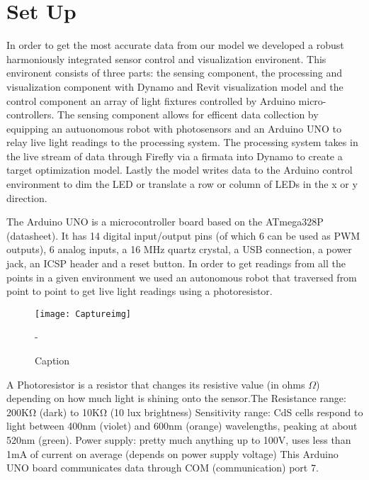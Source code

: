 \documentclass[a4paper]{article}
\begin{document}
\section{Set Up}
\label{sec:hardware}

In order to get the most accurate data from our model we developed a robust harmoniously integrated sensor control and visualization environent. This environent consists of three parts: the sensing component, the processing and visualization component with Dynamo and Revit visualization model and the control component an array of light fixtures controlled by Arduino micro-controllers. The sensing component allows for efficent data collection by equipping an autuonomous robot with photosensors and an Arduino UNO to relay live light readings to the processing system. The processing system takes in the live stream of data through Firefly via a firmata into Dynamo to create a target optimization model. Lastly the model writes data to the Arduino control environment to dim the LED or translate a row or column of LEDs in the x or y direction.





The Arduino UNO is a microcontroller board based on the ATmega328P (datasheet). It has 14 digital input/output pins (of which 6 can be used as PWM outputs), 6 analog inputs, a 16 MHz quartz crystal, a USB connection, a power jack, an ICSP header and a reset button. In order to get readings from all the points in a given environment we used an autonomous robot that traversed from point to point to get live light readings using a photoresistor.

\begin{figure*}
    \centering
    \texttt{[image: Captureimg]}
    \caption{Caption}-
    \label{fig:test}
\end{figure*}


A Photoresistor is a resistor that changes its resistive value (in ohms $\Omega$) depending on how much light is shining onto the sensor.The Resistance range: 200KΩ (dark) to 10KΩ (10 lux brightness) Sensitivity range: CdS cells respond to light between 400nm (violet) and 600nm (orange) wavelengths, peaking at about 520nm (green).
Power supply: pretty much anything up to 100V, uses less than 1mA of current on average (depends on power supply voltage) This Arduino UNO board communicates data through COM (communication) port 7. 
\end{document}
